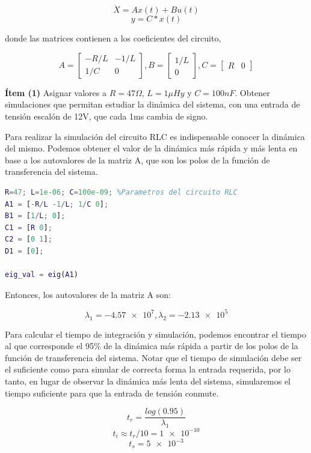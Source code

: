 \documentclass{article}
\begin{document}
$$\dot{X} = Ax(t)+Bu(t)$$
$$y=C*x(t)$$

donde las matrices contienen a los coeficientes del circuito,



\begin{equation}
  A = 
  \begin{bmatrix}
    -R/L & -1/L \\
    1/C & 0
  \end{bmatrix} 
  , B =
  \begin{bmatrix}
    1/L \\
    0
  \end{bmatrix} 
  , C = 
  \begin{bmatrix}
    R & 0
  \end{bmatrix} 
\end{equation}

\textbf{Ítem (1)} Asignar valores a $R=47\Omega$, $L=1\mu Hy$ y $C=100nF$. Obtener simulaciones que permitan
estudiar la dinámica del sistema, con una entrada de tensión escalón de 12V, 
que cada 1ms cambia de signo.

Para realizar la simulación del circuito RLC es indispensable conocer la dinámica del mismo.
Podemos obtener el valor de la dinámica más rápida y más lenta en base a los autovalores de la
matriz A, que son los polos de la función de transferencia del sistema.

\begin{lstlisting}[language=matlab]
R=47; L=1e-06; C=100e-09; %Parametros del circuito RLC
A1 = [-R/L -1/L; 1/C 0];
B1 = [1/L; 0];
C1 = [R 0];
C2 = [0 1]; 
D1 = [0];

eig_val = eig(A1)
\end{lstlisting}

Entonces, los autovalores de la matriz A son:

$$\lambda_1=\num{-4.57e7}, \lambda_2=\num{-2.13e5}$$

Para calcular el tiempo de integración y simulación, podemos encontrar el tiempo al que
corresponde el 95\% de la dinámica más rápida a partir de los polos de la función de
transferencia del sistema. Notar que el tiempo de
simulación debe ser el suficiente como para simular de correcta forma la entrada requerida, por lo tanto,
en lugar de observar la dinámica más lenta del sistema, simularemos el tiempo suficiente para que
la entrada de tensión conmute.


$$t_r = \frac{log(0.95)}{\lambda_1}$$
$$t_i \approx t_r/10 = \num{1e-10}$$
$$t_s = \num{5e-3}$$
\end{document}
